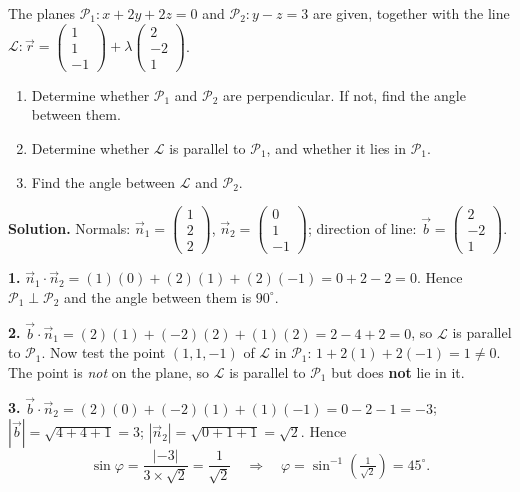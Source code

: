 \documentclass[11pt]{article}
\begin{document}
\begin{exoresolu}
The planes $\mathcal{P}_1: x+2y+2z=0$ and $\mathcal{P}_2: y-z=3$ are given, together with the line $\mathcal{L}: \vec{r}=\begin{pmatrix}1\\1\\-1\end{pmatrix}+\lambda\begin{pmatrix}2\\-2\\1\end{pmatrix}$.
\begin{enumerate}
\item Determine whether $\mathcal{P}_1$ and $\mathcal{P}_2$ are perpendicular. If not, find the angle between them.
\item Determine whether $\mathcal{L}$ is parallel to $\mathcal{P}_1$, and whether it lies in $\mathcal{P}_1$.
\item Find the angle between $\mathcal{L}$ and $\mathcal{P}_2$.
\end{enumerate}
\tcblower
\textbf{Solution.} Normals: $\vec{n}_1=\begin{pmatrix}1\\2\\2\end{pmatrix}$, $\vec{n}_2=\begin{pmatrix}0\\1\\-1\end{pmatrix}$; direction of line: $\vec{b}=\begin{pmatrix}2\\-2\\1\end{pmatrix}$.

\textbf{1.} $\vec{n}_1\cdot\vec{n}_2=(1)(0)+(2)(1)+(2)(-1)=0+2-2=0$. Hence $\mathcal{P}_1 \perp \mathcal{P}_2$ and the angle between them is $90^{\circ}$.

\textbf{2.} $\vec{b}\cdot\vec{n}_1=(2)(1)+(-2)(2)+(1)(2)=2-4+2=0$, so $\mathcal{L}$ is parallel to $\mathcal{P}_1$. Now test the point $(1,1,-1)$ of $\mathcal{L}$ in $\mathcal{P}_1$: $1+2(1)+2(-1)=1\neq 0$. The point is \emph{not} on the plane, so $\mathcal{L}$ is parallel to $\mathcal{P}_1$ but does \textbf{not} lie in it.

\textbf{3.} $\vec{b}\cdot\vec{n}_2=(2)(0)+(-2)(1)+(1)(-1)=0-2-1=-3$; $|\vec{b}|=\sqrt{4+4+1}=3$; $|\vec{n}_2|=\sqrt{0+1+1}=\sqrt{2}$. Hence
\[
\sin\varphi=\frac{|-3|}{3\times \sqrt{2}}=\frac{1}{\sqrt{2}}\quad\Longrightarrow\quad \varphi=\sin^{-1}\!\left(\tfrac{1}{\sqrt{2}}\right)=45^{\circ}.
\]
\end{exoresolu}
\end{document}
